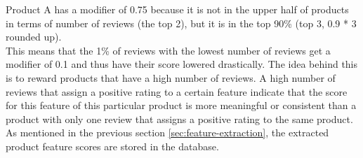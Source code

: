 Product A has a modifier of 0.75 because it is not in the upper half of products in terms of number of reviews (the top 2), but it is in the top 90\% (top 3, 0.9 * 3 rounded up).\\
This means that the 1\% of reviews with the lowest number of reviews get a modifier of 0.1 and thus have their score lowered drastically. The idea behind this is to reward products that have a high number of reviews. A high number of reviews that assign a positive rating to a certain feature indicate that the score for this feature of this particular product is more meaningful or consistent than a product with only one review that assigns a positive rating to the same product.\\
As mentioned in the previous section \ref{sec:feature-extraction}, the extracted product feature scores are stored in the database.

